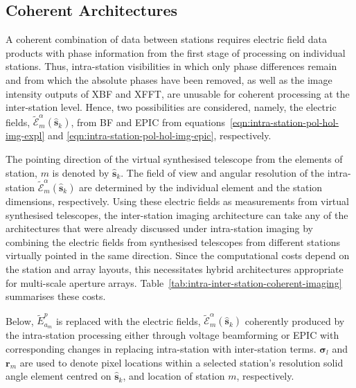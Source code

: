 \documentclass[
  journal=pasa,
  manuscript=article-type,
  year=2020,
  volume=37,
]{cup-journal}
\begin{document}
\subsection{Coherent Architectures} \label{sec:coherent}

A coherent combination of data between stations requires electric field data products with phase information from the first stage of processing on individual stations. Thus, intra-station visibilities in which only phase differences remain and from which the absolute phases have been removed, as well as the image intensity outputs of XBF and XFFT, are unusable for coherent processing at the inter-station level. Hence, two possibilities are considered, namely, the electric fields, $\widetilde{\mathcal{E}}_m^\alpha(\hat{\boldsymbol{s}}_k)$, from BF and EPIC from equations~\ref{eqn:intra-station-pol-hol-img-expl} and \ref{eqn:intra-station-pol-hol-img-epic},
respectively. 

The pointing direction of the virtual synthesised telescope from the elements of station, $m$ is denoted by $\hat{\boldsymbol{s}}_k$. The field of view and angular resolution of the intra-station $\widetilde{\mathcal{E}}_m^\alpha(\hat{\boldsymbol{s}}_k)$ are determined by the individual element and the station dimensions, respectively. Using these electric fields as measurements from virtual synthesised telescopes, the inter-station imaging architecture can take any of the architectures that were already discussed under intra-station imaging by combining the electric fields from synthesised telescopes from different stations virtually pointed in the same direction. Since the computational costs depend on the station and array layouts, this necessitates hybrid architectures appropriate for multi-scale aperture arrays. Table~\ref{tab:intra-inter-station-coherent-imaging} summarises these costs. 

Below, $\widetilde{E}_{a_m}^p$ is replaced with the electric fields, $\widetilde{\mathcal{E}}_m^\alpha(\hat{\boldsymbol{s}}_k)$
coherently produced by the intra-station processing either through voltage beamforming or EPIC with corresponding changes in replacing intra-station with inter-station terms. $\boldsymbol{\sigma}_l$ and $\boldsymbol{r}_{m}$ are used to denote pixel locations within a selected station's resolution solid angle element centred on $\hat{\boldsymbol{s}}_k$, and location of station $m$, respectively. 
\end{document}
